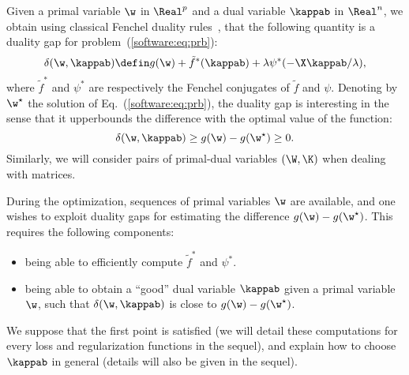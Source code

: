 \documentclass[a4paper, 11pt]{article}
\begin{document}
             Given a primal variable $\w$ in $\Real^p$ and a dual variable $\kappab$ in
             $\Real^n$, we obtain using classical Fenchel duality rules~\cite{borwein}, 
             that the following quantity is a duality gap for problem~(\ref{software:eq:prb}):
                \begin{displaymath}
                \delta(\w,\kappab) \defin g(\w) + \tilde{f}^\ast(\kappab) + \lambda\psi^\ast(-\X\kappab / \lambda),
                \end{displaymath}
                where $\tilde{f}^\ast$ and $\psi^\ast$ are respectively the Fenchel conjugates
                of $\tilde{f}$ and $\psi$.  Denoting by $\w^\star$ the solution of
                Eq.~(\ref{software:eq:prb}), the duality gap is interesting in the sense that
                it upperbounds the difference with the optimal value of the function:
                \begin{displaymath}
                \delta(\w,\kappab) \geq  g(\w)-g(\w^\star) \geq 0.
                \end{displaymath}
                Similarly, we will consider pairs of primal-dual variables $(\W,\K)$ when 
                dealing with matrices.

                During the optimization, sequences of primal variables $\w$ are available, 
                and one wishes to exploit duality gaps for estimating the difference
                $g(\w)-g(\w^\star)$. This requires the following components:
                \begin{itemize}
                \item being able to efficiently compute $\tilde{f}^\ast$ and $\psi^\ast$.
                \item being able to obtain a ``good'' dual variable $\kappab$ given a primal
                variable $\w$, such that $\delta(\w,\kappab)$ is close to
                $g(\w)-g(\w^\star)$.
                \end{itemize}

                We suppose that the first point is satisfied (we will detail these computations
                      for every loss and regularization functions in the sequel), and explain how to
                choose $\kappab$ in general (details will also be given in the sequel).
\end{document}
